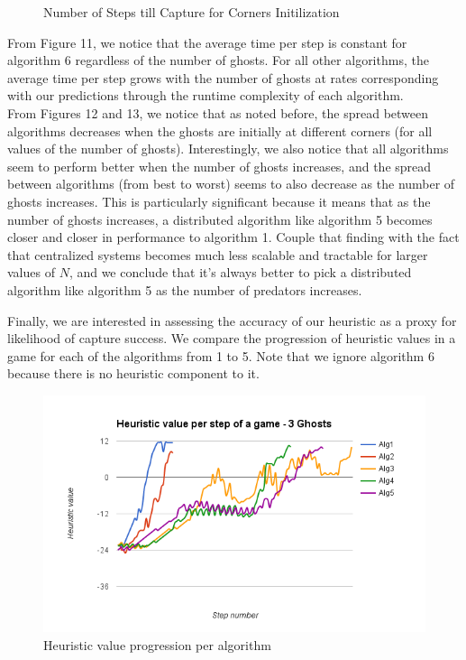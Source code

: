 \documentclass[11pt]{article}
\begin{document}
\begin{figure}[H]
	\caption{Number of Steps till Capture for Corners Initilization}
\end{figure}


\begin{multicols}{2}

From Figure 11, we notice that the average time per step is constant for algorithm 6 regardless of the number of ghosts. For all other algorithms, the average time per step grows with the number of ghosts at rates corresponding with our predictions through the runtime complexity of each algorithm.\\
From Figures 12 and 13, we notice that as noted before, the spread between algorithms decreases when the ghosts are initially at different corners (for all values of the number of ghosts). Interestingly, we also notice that all algorithms seem to perform better when the number of ghosts increases, and the spread between algorithms (from best to worst) seems to also decrease as the number of ghosts increases. This is particularly significant because it means that as the number of ghosts increases, a distributed algorithm like algorithm 5 becomes closer and closer in performance to algorithm 1. Couple that finding with the fact that centralized systems becomes much less scalable and tractable for larger values of $N$, and we conclude that it's always better to pick a distributed algorithm like algorithm 5 as the number of predators increases.

Finally, we are interested in assessing the accuracy of our heuristic as a proxy for likelihood of capture success. We compare the progression of heuristic values in a game for each of the algorithms from 1 to 5. Note that we ignore algorithm 6 because there is no heuristic component to it.\\
\begin{figure}[H]
	\includegraphics[scale=0.45]{heuristicvalues.png}
	\caption{Heuristic value progression per algorithm}
\end{figure}


\end{multicols}
\end{document}
